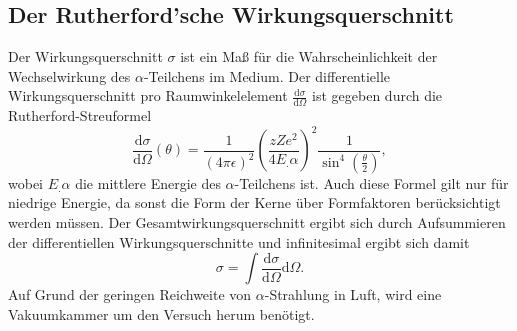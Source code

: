 \subsection{Der Rutherford'sche Wirkungsquerschnitt}
Der Wirkungsquerschnitt $\sigma$ ist ein Maß für die Wahrscheinlichkeit der Wechselwirkung des $\alpha$-Teilchens im Medium.
Der differentielle Wirkungsquerschnitt pro Raumwinkelelement $\frac{\mathrm{d}\sigma}{\mathrm{d}\Omega}$ ist gegeben durch die Rutherford-Streuformel
\begin{equation}
\frac{\mathrm{d}\sigma}{\mathrm{d}\Omega}(\theta)=\frac{1}{(4\pi\epsilon)^2}\left(\frac{z Z e^2}{4 E_.{\alpha}}\right)^2\frac{1}{\sin^4{\left(\frac{\theta}{2}\right)}},\label{eq:RSF}
\end{equation}
wobei $E_.{\alpha}$ die mittlere Energie des $\alpha$-Teilchens ist. Auch diese Formel gilt nur für niedrige Energie, da sonst die Form der Kerne über Formfaktoren berücksichtigt werden müssen.
Der Gesamtwirkungsquerschnitt ergibt sich durch Aufsummieren der differentiellen Wirkungsquerschnitte und infinitesimal ergibt sich damit
\[
\sigma = \int \frac{\mathrm{d}\sigma}{\mathrm{d}\Omega}\mathrm{d}\Omega\text{.}
\]
Auf Grund der geringen Reichweite von $\alpha$-Strahlung in Luft, wird eine Vakuumkammer um den Versuch herum benötigt.






